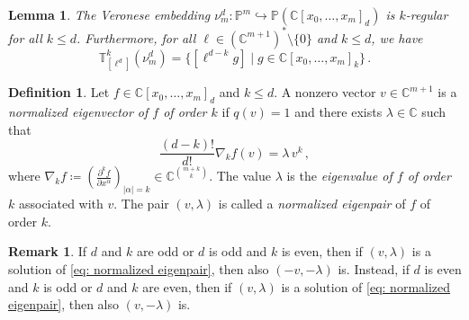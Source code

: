 \documentclass[11pt,reqno]{amsart}
\numberwithin{equation}{section}
\theoremstyle{plain}
\numberwithin{theorem}{section}
\newtheorem{lemma}[theorem]{Lemma}
\theoremstyle{definition}
\newtheorem{definition}[theorem]{Definition}
\newtheorem{remark}[theorem]{Remark}
\renewcommand{\P}{\mathbb{P}}
\newcommand{\C}{\mathbb{C}}
\newcommand{\T}{\mathbb{T}}
\begin{document}
\begin{lemma}\label{lem: osculating space of a Veronese variety}
The Veronese embedding $\nu_m^d\colon\P^m\hookrightarrow\P(\C[x_0,\dots,x_m]_d)$ is $k$-regular for all $k\le d$. Furthermore, for all $\ell\in(\C^{m+1})^*\setminus\{0\}$ and $k\le d$, we have
\begin{equation}
    \T_{[\ell^d]}^k(\nu_m^d) = \{[\ell^{d-k}g]\mid g\in \C[x_0,\dots,x_m]_k\}\,.
\end{equation}
\end{lemma}

\begin{definition}\label{def: kth order eigenpoint}
Let $f\in\C[x_0,\dots,x_m]_d$ and $k\le d$. A nonzero vector $v\in\C^{m+1}$ is a {\em normalized eigenvector of $f$ of order $k$} if $q(v)=1$ and there exists $\lambda\in\C$ such that
\begin{equation}\label{eq: normalized eigenpair}
\frac{(d-k)!}{d!}\nabla_kf(v) = \lambda\,v^k\,,
\end{equation}
where $\nabla_kf\coloneqq \left(\frac{\partial^k f}{\partial x^\alpha}\right)_{|\alpha|=k}\in\C^{\binom{m+k}{k}}$.
The value $\lambda$ is the {\em eigenvalue of $f$ of order $k$} associated with $v$. The pair $(v,\lambda)$ is called a {\em normalized eigenpair} of $f$ of order $k$.
\end{definition}

\begin{remark}\label{rmk: even odd}
If $d$ and $k$ are odd or $d$ is odd and $k$ is even, then if $(v,\lambda)$ is a solution of \eqref{eq: normalized eigenpair}, then also $(-v,-\lambda)$ is. Instead, if $d$ is even and $k$ is odd or $d$ and $k$ are even, then if $(v,\lambda)$ is a solution of \eqref{eq: normalized eigenpair}, then also $(v,-\lambda)$ is.
\end{remark}
\end{document}
